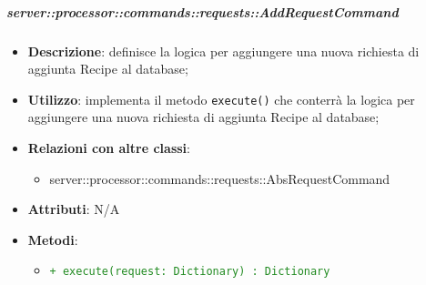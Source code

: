         \subparagraph{server::processor::commands::requests::AddRequestCommand} %
        \label{subp:bdsm_app_server_processor_commands_requests_addrequestcommand}
        \begin{itemize}
          \item \textbf{Descrizione}: definisce la logica per aggiungere una nuova richiesta di aggiunta Recipe al database;
          \item \textbf{Utilizzo}: implementa il metodo \texttt{execute()} che conterrà la logica per aggiungere una nuova richiesta di aggiunta Recipe al database;
          \item \textbf{Relazioni con altre classi}:
            \begin{itemize}
              \item server::processor::commands::requests::AbsRequestCommand
            \end{itemize}
          \item \textbf{Attributi}: N/A
          \item \textbf{Metodi}:
          \begin{itemize}
              \item \textcolor{forestgreen}{\texttt{+ execute(request: Dictionary) : Dictionary}}
          \end{itemize}
        \end{itemize}


